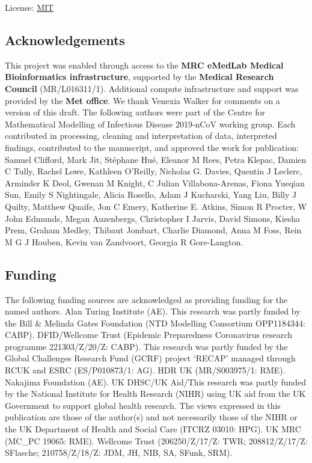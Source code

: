 \documentclass[]{article}
\begin{document}
License: \href{https://opensource.org/licenses/MIT}{MIT}

\hypertarget{acknowledgements}{%
\subsection{Acknowledgements}\label{acknowledgements}}

This project was enabled through access to the \textbf{MRC eMedLab
Medical Bioinformatics infrastructure}, supported by the \textbf{Medical
Research Council} (MR/L016311/1). Additional compute infrastructure and
support was provided by the \textbf{Met office}. We thank Venexia Walker
for comments on a version of this draft. The following authors were part
of the Centre for Mathematical Modelling of Infectious Disease 2019-nCoV
working group. Each contributed in processing, cleaning and
interpretation of data, interpreted findings, contributed to the
manuscript, and approved the work for publication: Samuel Clifford, Mark
Jit, Stéphane Hué, Eleanor M Rees, Petra Klepac, Damien C Tully, Rachel
Lowe, Kathleen O'Reilly, Nicholas G. Davies, Quentin J Leclerc, Arminder
K Deol, Gwenan M Knight, C Julian Villabona-Arenas, Fiona Yueqian Sun,
Emily S Nightingale, Alicia Rosello, Adam J Kucharski, Yang Liu, Billy J
Quilty, Matthew Quaife, Jon C Emery, Katherine E. Atkins, Simon R
Procter, W John Edmunds, Megan Auzenbergs, Christopher I Jarvis, David
Simons, Kiesha Prem, Graham Medley, Thibaut Jombart, Charlie Diamond,
Anna M Foss, Rein M G J Houben, Kevin van Zandvoort, Georgia R
Gore-Langton.

\hypertarget{funding}{%
\subsection{Funding}\label{funding}}

The following funding sources are acknowledged as providing funding for
the named authors. Alan Turing Institute (AE). This research was partly
funded by the Bill \& Melinda Gates Foundation (NTD Modelling Consortium
OPP1184344: CABP). DFID/Wellcome Trust (Epidemic Preparedness
Coronavirus research programme 221303/Z/20/Z: CABP). This research was
partly funded by the Global Challenges Research Fund (GCRF) project
`RECAP' managed through RCUK and ESRC (ES/P010873/1: AG). HDR UK
(MR/S003975/1: RME). Nakajima Foundation (AE). UK DHSC/UK Aid/This
research was partly funded by the National Institute for Health Research
(NIHR) using UK aid from the UK Government to support global health
research. The views expressed in this publication are those of the
author(s) and not necessarily those of the NIHR or the UK Department of
Health and Social Care (ITCRZ 03010: HPG). UK MRC (MC\_PC 19065: RME).
Wellcome Trust (206250/Z/17/Z: TWR; 208812/Z/17/Z: SFlasche;
210758/Z/18/Z: JDM, JH, NIB, SA, SFunk, SRM).
\end{document}
